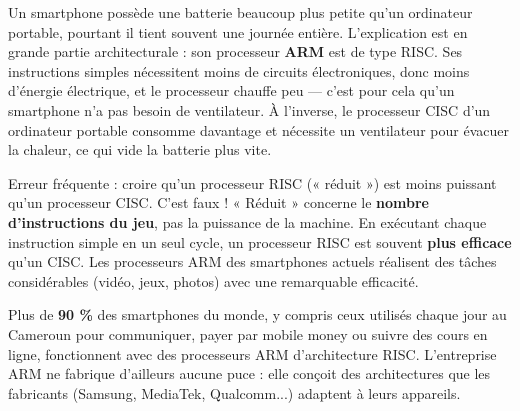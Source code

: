\documentclass[11pt]{article}
\newcommand{\cle}[1]{{\popxbold\color{popdark}#1}}
\begin{document}
\begin{exemplebox}
Un smartphone possède une batterie beaucoup plus petite qu'un ordinateur portable, pourtant il tient souvent une journée entière. L'explication est en grande partie architecturale : son processeur \textbf{ARM} est de type \cle{RISC}. Ses instructions simples nécessitent moins de circuits électroniques, donc moins d'énergie électrique, et le processeur chauffe peu — c'est pour cela qu'un smartphone n'a pas besoin de ventilateur. À l'inverse, le processeur \cle{CISC} d'un ordinateur portable consomme davantage et nécessite un ventilateur pour évacuer la chaleur, ce qui vide la batterie plus vite.
\end{exemplebox}

\begin{attention}
Erreur fréquente : croire qu'un processeur \cle{RISC} (« réduit ») est moins puissant qu'un processeur CISC. C'est faux ! « Réduit » concerne le \textbf{nombre d'instructions du jeu}, pas la puissance de la machine. En exécutant chaque instruction simple en un seul cycle, un processeur RISC est souvent \textbf{plus efficace} qu'un CISC. Les processeurs ARM des smartphones actuels réalisent des tâches considérables (vidéo, jeux, photos) avec une remarquable efficacité.
\end{attention}

\begin{savaistu}
Plus de \textbf{90 \%} des smartphones du monde, y compris ceux utilisés chaque jour au Cameroun pour communiquer, payer par mobile money ou suivre des cours en ligne, fonctionnent avec des processeurs \cle{ARM} d'architecture \cle{RISC}. L'entreprise ARM ne fabrique d'ailleurs aucune puce : elle conçoit des architectures que les fabricants (Samsung, MediaTek, Qualcomm...) adaptent à leurs appareils.
\end{savaistu}
\end{document}
